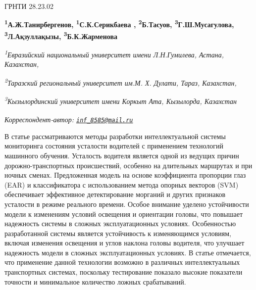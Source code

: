 ГРНТИ 28.23.02

\begin{articleheader}

{\bfseries \textsuperscript{1}А.Ж.Танирбергенов\authorid,
\textsuperscript{1}С.К.Серикбаева\textsuperscript{\envelope } \authorid,
\textsuperscript{2}Б.Тасуов\authorid,
\textsuperscript{3}Г.Ш.Мусагулова\authorid,
\textsuperscript{3}Л.Ақзуллақызы\authorid,
\textsuperscript{3}Б.К.Жарменова\authorid}
\end{articleheader}

\begin{affiliation}
\emph{\textsuperscript{1}Евразийский национальный университет имени Л.Н.Гумилева, Астана, Казахстан,}

\emph{\textsuperscript{2}Таразский региональный университет им.М. Х. Дулати, Тараз, Казахстан,}

\emph{\textsuperscript{3}Кызылординский университет имени Коркыт Ата, Кызылорда, Казахстан}

\textsuperscript{\envelope }\emph{Корреспондент-автор: \href{mailto:inf_8585@mail.ru}{\nolinkurl{inf\_8585@mail.ru}}}
\end{affiliation}

В статье рассматриваются методы разработки интеллектуальной системы
мониторинга состояния усталости водителей с применением технологий
машинного обучения. Усталость водителя является одной из ведущих причин
дорожно-транспортных происшествий, особенно на длительных маршрутах и
при ночных сменах. Предложенная модель на основе коэффициента пропорции
глаз (EAR) и классификатора с использованием метода опорных векторов
(SVM) обеспечивает эффективное детектирование морганий и других
признаков усталости в режиме реального времени. Особое внимание уделено
устойчивости модели к изменениям условий освещения и ориентации головы,
что повышает надежность системы в сложных эксплуатационных условиях.
Особенностью разработанной системы является устойчивость к изменяющимся
условиям, включая изменения освещения и углов наклона головы водителя,
что улучшает надежность модели в сложных эксплуатационных условиях. В
статье отмечается, что применение данной технологии возможно в различных
интеллектуальных транспортных системах, поскольку тестирование показало
высокие показатели точности и минимальное количество ложных
срабатываний.

